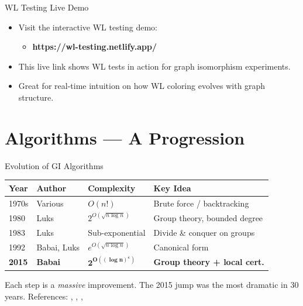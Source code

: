 \documentclass[10pt, aspectratio=169]{beamer}
\begin{document}
\begin{frame}{WL Testing Live Demo}
	\begin{itemize}
		\item Visit the interactive WL testing demo:
		\begin{itemize}
			\item \textbf{https://wl-testing.netlify.app/}
		\end{itemize}
		\item This live link shows WL tests in action for graph isomorphism experiments.
		\item Great for real-time intuition on how WL coloring evolves with graph structure.
	\end{itemize}
\end{frame}

\section{Algorithms — A Progression}

\begin{frame}{Evolution of GI Algorithms}
	\centering
	\renewcommand{\arraystretch}{1.5}
	\begin{tabular}{lllp{4.5cm}}
		\toprule
		\textbf{Year} & \textbf{Author} & \textbf{Complexity}          & \textbf{Key Idea}                   \\
		\midrule
		1970s         & Various         & $O(n!)$                      & Brute force / backtracking          \\
		1980          & Luks            & $2^{O(\sqrt{n \log n})}$     & Group theory, bounded degree        \\
		1983          & Luks            & Sub-exponential              & Divide \& conquer on groups         \\
		1992          & Babai, Luks     & $e^{O(\sqrt{n \log n})}$     & Canonical form                      \\
		\textbf{2015} & \textbf{Babai}  & $\mathbf{2^{O((\log n)^c)}}$ & \textbf{Group theory + local cert.} \\
		\bottomrule
	\end{tabular}

	\vspace{0.8em}
	\begin{tcolorbox}[keybox]
		Each step is a \textit{massive} improvement. The 2015 jump was the most dramatic in 30 years.
		\newline
		\small References: \cite{Luks1980}, \cite{Luks1983}, \cite{Babai1992}, \cite{Babai2015}
	\end{tcolorbox}
\end{frame}
\end{document}
